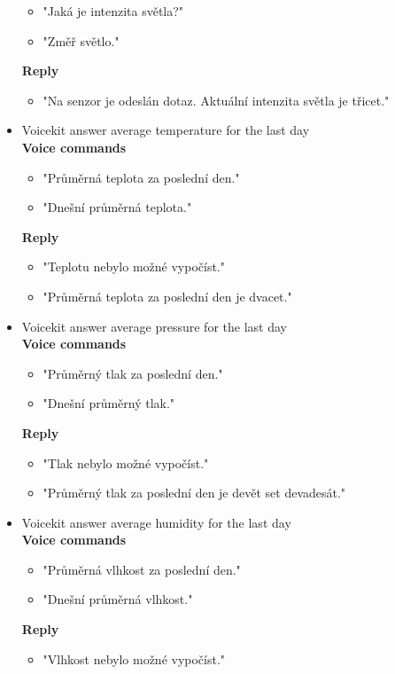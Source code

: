 \begin{itemize}
\begin{itemize}
        \item "Jaká je intenzita světla?"
        \item "Změř světlo."
    \end{itemize}
    \textbf{Reply}
    \begin{itemize}
        \item "Na senzor je odeslán dotaz. Aktuální intenzita světla je třicet."
    \end{itemize}
    \item Voicekit answer average temperature for the last day\\
    \textbf{Voice commands}
    \begin{itemize}
        \item "Průměrná teplota za poslední den."
        \item "Dnešní průměrná teplota."
    \end{itemize}
    \textbf{Reply}
    \begin{itemize}
        \item "Teplotu nebylo možné vypočíst."
        \item "Průměrná teplota za poslední den je dvacet."
    \end{itemize}
    \item Voicekit answer average pressure for the last day\\
    \textbf{Voice commands}
    \begin{itemize}
        \item "Průměrný tlak za poslední den."
        \item "Dnešní průměrný tlak."
    \end{itemize}
    \textbf{Reply}
    \begin{itemize}
        \item "Tlak nebylo možné vypočíst."
        \item "Průměrný tlak za poslední den je devět set devadesát."
    \end{itemize}
    \item Voicekit answer average humidity for the last day\\
    \textbf{Voice commands}
    \begin{itemize}
        \item "Průměrná vlhkost za poslední den."
        \item "Dnešní průměrná vlhkost."
    \end{itemize}
    \textbf{Reply}
    \begin{itemize}
        \item "Vlhkost nebylo možné vypočíst."

\end{itemize}
\end{itemize}
